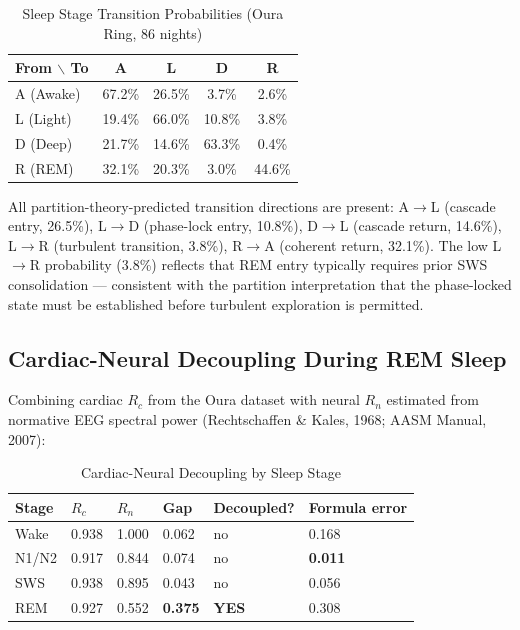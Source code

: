 \documentclass[12pt,a4paper]{article}
\theoremstyle{definition}
\begin{document}
\begin{table}[H]
\centering
\caption{Sleep Stage Transition Probabilities (Oura Ring, 86 nights)}
\label{tab:transitions}
\begin{tabular}{lcccc}
\toprule
\textbf{From $\backslash$ To} & \textbf{A} & \textbf{L} & \textbf{D} & \textbf{R}\\
\midrule
A (Awake)  & 67.2\% & 26.5\% & 3.7\% & 2.6\%\\
L (Light)  & 19.4\% & 66.0\% & 10.8\% & 3.8\%\\
D (Deep)   & 21.7\% & 14.6\% & 63.3\% & 0.4\%\\
R (REM)    & 32.1\% & 20.3\% & 3.0\% & 44.6\%\\
\bottomrule
\end{tabular}
\end{table}

All partition-theory-predicted transition directions are present:
A$\to$L (cascade entry, 26.5\%), L$\to$D (phase-lock entry, 10.8\%),
D$\to$L (cascade return, 14.6\%), L$\to$R (turbulent transition, 3.8\%),
R$\to$A (coherent return, 32.1\%). The low L$\to$R probability (3.8\%)
reflects that REM entry typically requires prior SWS consolidation
--- consistent with the partition interpretation that the phase-locked
state must be established before turbulent exploration is permitted.

\subsection{Cardiac-Neural Decoupling During REM Sleep}

Combining cardiac $R_c$ from the Oura dataset with neural $R_n$ estimated
from normative EEG spectral power (Rechtschaffen \& Kales, 1968;
AASM Manual, 2007):

\begin{table}[H]
\centering
\caption{Cardiac-Neural Decoupling by Sleep Stage}
\label{tab:cn_decoupling}
\begin{tabular}{llllll}
\toprule
\textbf{Stage} & \textbf{$R_c$} & \textbf{$R_n$} & \textbf{Gap} &
\textbf{Decoupled?} & \textbf{Formula error}\\
\midrule
Wake   & 0.938 & 1.000 & 0.062 & no  & 0.168\\
N1/N2  & 0.917 & 0.844 & 0.074 & no  & \textbf{0.011}\\
SWS    & 0.938 & 0.895 & 0.043 & no  & 0.056\\
REM    & 0.927 & 0.552 & \textbf{0.375} & \textbf{YES} & 0.308\\
\bottomrule
\end{tabular}
\end{table}
\end{document}

